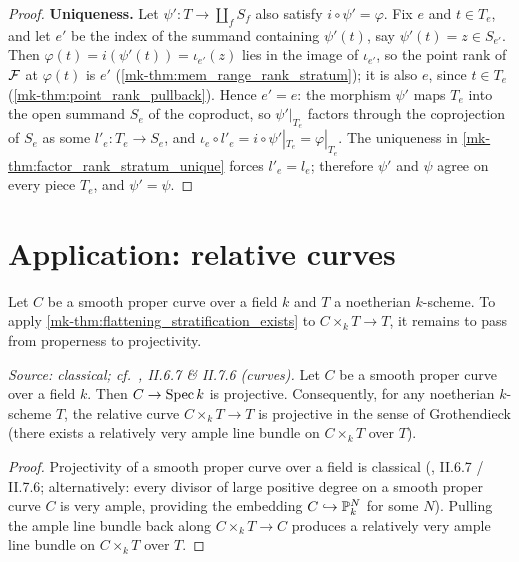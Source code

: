 \begin{proof}
  \textbf{Uniqueness.}  Let \(\psi' : T \to \coprod_f S_f\) also satisfy
  \(i \circ \psi' = \varphi\).  Fix \(e\) and \(t \in T_e\), and let
  \(e'\) be the index of the summand containing \(\psi'(t)\), say
  \(\psi'(t) = z \in S_{e'}\).  Then
  \(\varphi(t) = i(\psi'(t)) = \iota_{e'}(z)\) lies in the image of
  \(\iota_{e'}\), so the point rank of \(\mathcal{F}\) at \(\varphi(t)\) is \(e'\)
  (\ref{mk-thm:mem_range_rank_stratum}); it is also \(e\), since
  \(t \in T_e\) (\ref{mk-thm:point_rank_pullback}).  Hence \(e' = e\): the
  morphism \(\psi'\) maps \(T_e\) into the open summand \(S_e\) of the
  coproduct, so \(\psi'|_{T_e}\) factors through the coprojection of
  \(S_e\) as some \(l'_e : T_e \to S_e\), and
  \(\iota_e \circ l'_e = i \circ \psi'|_{T_e} = \varphi|_{T_e}\).  The
  uniqueness in \ref{mk-thm:factor_rank_stratum_unique} forces
  \(l'_e = l_e\); therefore \(\psi'\) and \(\psi\) agree on every piece
  \(T_e\), and \(\psi' = \psi\).
\end{proof}

\section{Application: relative curves}
\label{mk-sec:flatstrat_curve_application}

Let \(C\) be a smooth proper curve over a field \(k\) and \(T\) a noetherian
\(k\)-scheme.  To apply \ref{mk-thm:flattening_stratification_exists} to
\(C \times_k T \to T\), it remains to pass from properness to projectivity.

\begin{lemma}
  \label{mk-lem:smooth_proper_curve_projective}
  \textit{Source: classical; cf.\ \cite{hartshorne-ag}, II.6.7 \& II.7.6 (curves).}
  Let \(C\) be a smooth proper curve over a field \(k\).  Then \(C \to \operatorname{Spec} k\) is
  projective.  Consequently, for any noetherian \(k\)-scheme \(T\), the relative
  curve \(C \times_k T \to T\) is projective in the sense of Grothendieck (there
  exists a relatively very ample line bundle on \(C \times_k T\) over \(T\)).
\end{lemma}

\begin{proof}
  Projectivity of a smooth proper curve over a field is classical
  (\cite{hartshorne-ag}, II.6.7 / II.7.6; alternatively: every divisor of large
  positive degree on a smooth proper curve \(C\) is very ample, providing the
  embedding \(C \hookrightarrow \mathbb{P}^N_k\) for some \(N\)). Pulling the ample line
  bundle back along \(C \times_k T \to C\) produces a relatively very ample line
  bundle on \(C \times_k T\) over \(T\).
\end{proof}

